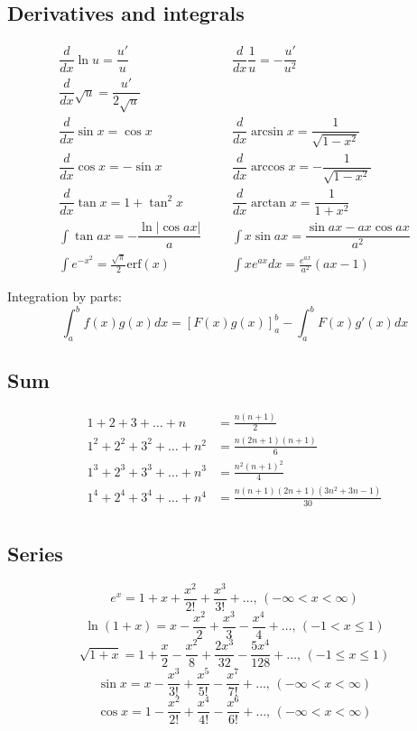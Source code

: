 \documentclass[A4 paper, 12pt, oneside, landscape]{article}
\begin{document}
\begin{multicols}{2}
	\subsection{Derivatives and integrals}
	\begin{align*}
        \dfrac{d}{dx}\ln{u} = \dfrac{u'}{u} &&& \dfrac{d}{dx}\dfrac{1}{u} = -\dfrac{u'}{u^2} \\
    	\dfrac{d}{dx}\sqrt u = \dfrac{u'}{2\sqrt u} \\
    	\dfrac{d}{dx}\sin x = \cos x &&& \dfrac{d}{dx}\arcsin x = \dfrac{1}{\sqrt{1-x^2}} \\ 
    	\dfrac{d}{dx}\cos x = -\sin x &&& \dfrac{d}{dx}\arccos x = -\dfrac{1}{\sqrt{1-x^2}} \\
    	\dfrac{d}{dx}\tan x = 1+\tan^2 x &&& \dfrac{d}{dx}\arctan x = \dfrac{1}{1+x^2} \\
    	\int\tan ax = -\dfrac{\ln|\cos ax|}{a} &&& \int x\sin ax = \dfrac{\sin ax-ax \cos ax}{a^2} \\
    	\int e^{-x^2} = \frac{\sqrt \pi}{2} \text{erf}(x) &&& \int xe^{ax}dx = \frac{e^{ax}}{a^2}(ax-1)
	\end{align*}

    Integration by parts:
    \[\int_a^bf(x)g(x)dx = [F(x)g(x)]_a^b-\int_a^bF(x)g'(x)dx\]	
	
	\subsection{Sum}
	\begin{align*}
    	1 + 2 + 3 + \dots + n &= \frac{n(n+1)}{2} \\
    	1^2 + 2^2 + 3^2 + \dots + n^2 &= \frac{n(2n+1)(n+1)}{6} \\
    	1^3 + 2^3 + 3^3 + \dots + n^3 &= \frac{n^2(n+1)^2}{4} \\
    	1^4 + 2^4 + 3^4 + \dots + n^4 &= \frac{n(n+1)(2n+1)(3n^2 + 3n - 1)}{30} \\
    \end{align*}
    
    \subsection{Series}
    $$e^x = 1+x+\frac{x^2}{2!}+\frac{x^3}{3!}+\dots,\,(-\infty<x<\infty)$$
    $$\ln(1+x) = x-\frac{x^2}{2}+\frac{x^3}{3}-\frac{x^4}{4}+\dots,\,(-1<x\leq1)$$
    $$\sqrt{1+x} = 1+\frac{x}{2}-\frac{x^2}{8}+\frac{2x^3}{32}-\frac{5x^4}{128}+\dots,\,(-1\leq x\leq1)$$
    $$\sin x = x-\frac{x^3}{3!}+\frac{x^5}{5!}-\frac{x^7}{7!}+\dots,\,(-\infty<x<\infty)$$
    $$\cos x = 1-\frac{x^2}{2!}+\frac{x^4}{4!}-\frac{x^6}{6!}+\dots,\,(-\infty<x<\infty)$$
    

\end{multicols}
\end{document}
